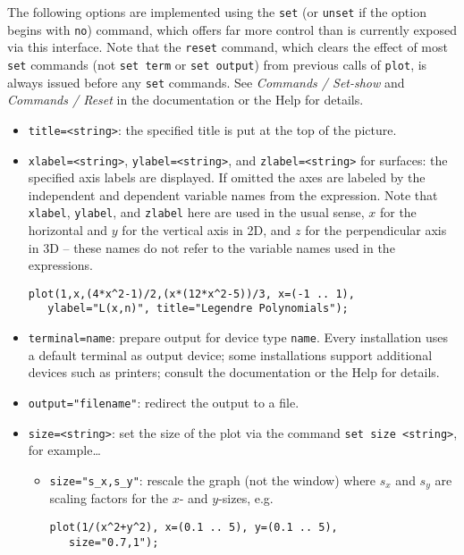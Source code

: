 The following options are implemented using the {\Gnuplot}
\texttt{set} (or \texttt{unset} if the option begins with \texttt{no})
command, which offers far more control than is currently exposed via
this interface.  Note that the {\Gnuplot} \texttt{reset} command,
which clears the effect of most \texttt{set} commands (not \texttt{set
  term} or \texttt{set output}) from previous calls of \texttt{plot},
is always issued before any \texttt{set} commands.  See \emph{Commands
/ Set-show} and \emph{Commands / Reset} in the {\Gnuplot}
documentation or the {\Gnuplot} Help for details.
\begin{itemize}
  \item \texttt{title=<string>}: the specified title is put at the top
    of the picture.
  \item \texttt{xlabel=<string>}, \texttt{ylabel=<string>}, and
    \texttt{zlabel=<string>} for surfaces: the specified axis labels
    are displayed.  If omitted the axes are labeled by the independent
    and dependent variable names from the expression. Note that
    \texttt{xlabel}, \texttt{ylabel}, and \texttt{zlabel} here are
    used in the usual sense, $x$ for the horizontal and $y$ for the
    vertical axis in 2D, and $z$ for the perpendicular axis in 3D --
    these names do not refer to the variable names used in the
    expressions.
\begin{verbatim}
plot(1,x,(4*x^2-1)/2,(x*(12*x^2-5))/3, x=(-1 .. 1),
   ylabel="L(x,n)", title="Legendre Polynomials");
\end{verbatim}
  \item \texttt{terminal=name}: prepare output for device type
    \texttt{name}.  Every installation uses a default terminal as
    output device; some installations support additional devices such
    as printers; consult the {\Gnuplot} documentation or the
    {\Gnuplot} Help for details.
  \item \texttt{output="filename"}: redirect the output to a file.
  \item \texttt{size=<string>}: set the size of the plot via the
    {\Gnuplot} command \texttt{set size <string>}, for example\ldots
    \begin{itemize}
    \item \texttt{size="s\_x,s\_y"}: rescale the graph (not the
      window) where $s_x$ and $s_y$ are scaling factors for the $x$-
      and $y$-sizes, e.g.
\begin{verbatim}
plot(1/(x^2+y^2), x=(0.1 .. 5), y=(0.1 .. 5),
   size="0.7,1");
\end{verbatim}

\end{itemize}
\end{itemize}
